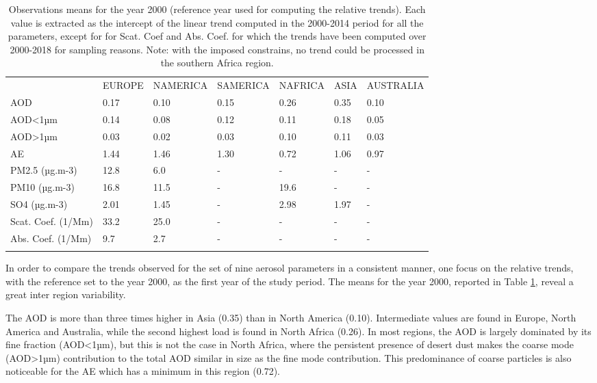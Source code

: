 \documentclass[journal abbreviation, manuscript]{copernicus}
\begin{document}
\begin{table}
\begin{tabular}{lllllll}
\tophline
                    & EUROPE & NAMERICA & SAMERICA & NAFRICA &  ASIA & AUSTRALIA \\
\middlehline
                AOD &   0.17 &     0.10 &     0.15 &    0.26 &  0.35 &      0.10 \\
            AOD<1µm &   0.14 &     0.08 &     0.12 &    0.11 &  0.18 &      0.05 \\
            AOD>1µm &   0.03 &     0.02 &     0.03 &    0.10 &  0.11 &      0.03 \\
                 AE &   1.44 &     1.46 &     1.30 &    0.72 &  1.06 &      0.97 \\
     PM2.5 (µg.m-3) &   12.8 &      6.0 &        - &       - &     - &         - \\
      PM10 (µg.m-3) &   16.8 &     11.5 &        - &    19.6 &     - &         - \\
       SO4 (µg.m-3) &   2.01 &     1.45 &        - &    2.98 &  1.97 &         - \\
 Scat. Coef. (1/Mm) &   33.2 &     25.0 &        - &       - &     - &         - \\
  Abs. Coef. (1/Mm) &    9.7 &      2.7 &        - &       - &     - &         - \\
\bottomhline
\end{tabular}

 \caption{Observations means for the year 2000 (reference year used for computing the relative trends). Each value is extracted as the intercept of the linear trend computed in the 2000-2014 period for all the parameters, except for for Scat. Coef and Abs. Coef. for which the trends have been computed over 2000-2018 for sampling reasons. Note: with the imposed constrains, no trend could be processed in the southern Africa region.}
 \label{table:obs_2000mean}
\end{table}

In order to compare the trends observed for the set of nine aerosol parameters in a consistent manner, one focus on the relative trends, with the reference set to the year 2000, as the first year of the study period. The means for the year 2000, reported in Table \ref{table:obs_2000mean}, reveal a great inter region variability.

The AOD is more than three times higher in Asia (0.35) than in North America (0.10). Intermediate values are found in Europe, North America and Australia, while the second highest load is found in North Africa (0.26). In most regions, the AOD is largely dominated by its fine fraction (AOD<1µm), but this is not the case in North Africa, where the persistent presence of desert dust makes the coarse mode (AOD>1µm) contribution to the total AOD similar in size as the fine mode contribution. This predominance of coarse particles is also noticeable for the AE which has a minimum in this region (0.72).
\end{document}
